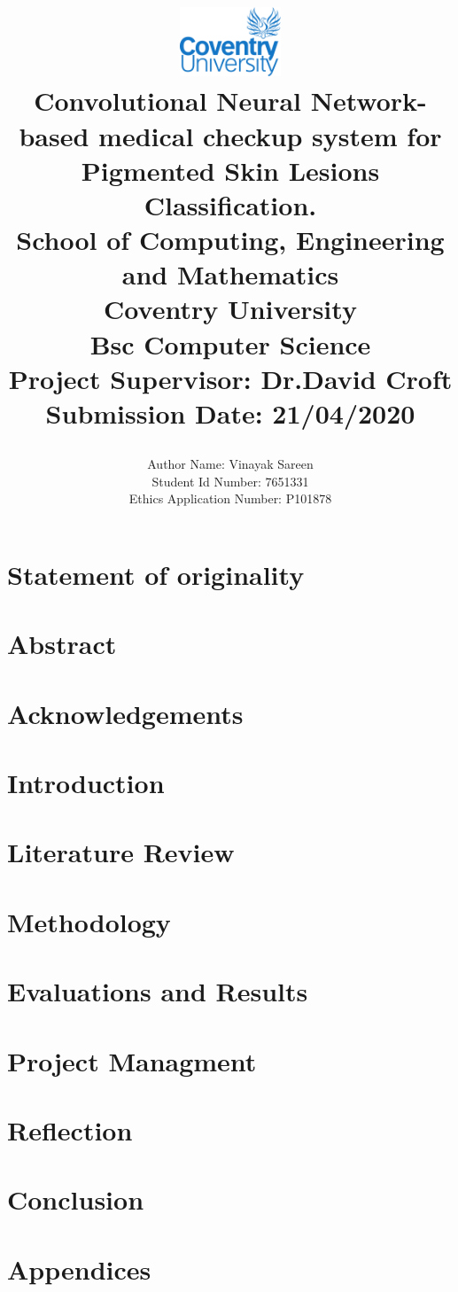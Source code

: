 \documentclass{report}
\title{
	\begin{center}
	\includegraphics[width=3cm]{Images/covlogo.png} \\
	\vspace{2mm}
	{Convolutional Neural Network-based medical checkup system for Pigmented Skin Lesions Classification.} \\
	\vspace{5mm} %
	\large {
		{School of Computing, Engineering and Mathematics}\\
		{Coventry University}\\
	}
	\vspace{3mm} %
	\textbf{ Bsc Computer Science}\\
	{\large Project Supervisor: Dr.David Croft}\\
	{\large Submission Date: 21/04/2020} \\
	\end{center}
}
\author{
	{\large Author Name:  Vinayak Sareen} \\
	{\large Student Id Number:  7651331} \\
	{\large Ethics Application Number: P101878 }\\
}
\date{}
\begin{document}
\maketitle

\chapter*{Statement of originality}


\chapter*{Abstract}


\tableofcontents

\chapter*{Acknowledgements}


\chapter{Introduction}


\chapter{Literature Review}


\chapter{Methodology}


\chapter{Evaluations and Results}


\chapter{Project Managment}


\chapter{Reflection}


\chapter{Conclusion}





\chapter{Appendices}

\end{document}
